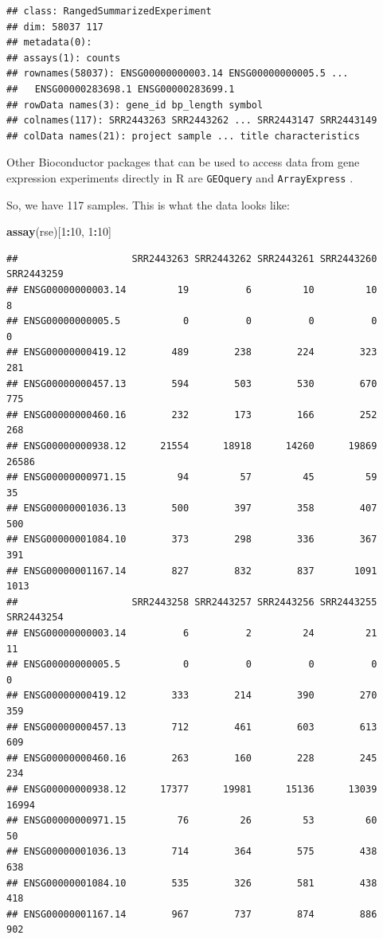 \documentclass[9pt,a4paper,]{extarticle}
\newenvironment{Shaded}{\begin{snugshade}}{\end{snugshade}}
\newcommand{\KeywordTok}[1]{\textcolor[rgb]{0.13,0.29,0.53}{\textbf{#1}}}
\newcommand{\DecValTok}[1]{\textcolor[rgb]{0.00,0.00,0.81}{#1}}
\newcommand{\OperatorTok}[1]{\textcolor[rgb]{0.81,0.36,0.00}{\textbf{#1}}}
\newcommand{\NormalTok}[1]{#1}
\begin{document}
\begin{verbatim}
## class: RangedSummarizedExperiment 
## dim: 58037 117 
## metadata(0):
## assays(1): counts
## rownames(58037): ENSG00000000003.14 ENSG00000000005.5 ...
##   ENSG00000283698.1 ENSG00000283699.1
## rowData names(3): gene_id bp_length symbol
## colnames(117): SRR2443263 SRR2443262 ... SRR2443147 SRR2443149
## colData names(21): project sample ... title characteristics
\end{verbatim}

Other Bioconductor packages that can be used to access data from gene expression experiments directly in R are \texttt{GEOquery} \citep{Davis2007} and \texttt{ArrayExpress} \citep{Kauffmann2009}.

So, we have 117 samples.
This is what the data looks like:

\begin{Shaded}
\begin{Highlighting}[]
\KeywordTok{assay}\NormalTok{(rse)[}\DecValTok{1}\OperatorTok{:}\DecValTok{10}\NormalTok{, }\DecValTok{1}\OperatorTok{:}\DecValTok{10}\NormalTok{]}
\end{Highlighting}
\end{Shaded}

\begin{verbatim}
##                    SRR2443263 SRR2443262 SRR2443261 SRR2443260 SRR2443259
## ENSG00000000003.14         19          6         10         10          8
## ENSG00000000005.5           0          0          0          0          0
## ENSG00000000419.12        489        238        224        323        281
## ENSG00000000457.13        594        503        530        670        775
## ENSG00000000460.16        232        173        166        252        268
## ENSG00000000938.12      21554      18918      14260      19869      26586
## ENSG00000000971.15         94         57         45         59         35
## ENSG00000001036.13        500        397        358        407        500
## ENSG00000001084.10        373        298        336        367        391
## ENSG00000001167.14        827        832        837       1091       1013
##                    SRR2443258 SRR2443257 SRR2443256 SRR2443255 SRR2443254
## ENSG00000000003.14          6          2         24         21         11
## ENSG00000000005.5           0          0          0          0          0
## ENSG00000000419.12        333        214        390        270        359
## ENSG00000000457.13        712        461        603        613        609
## ENSG00000000460.16        263        160        228        245        234
## ENSG00000000938.12      17377      19981      15136      13039      16994
## ENSG00000000971.15         76         26         53         60         50
## ENSG00000001036.13        714        364        575        438        638
## ENSG00000001084.10        535        326        581        438        418
## ENSG00000001167.14        967        737        874        886        902
\end{verbatim}
\end{document}
